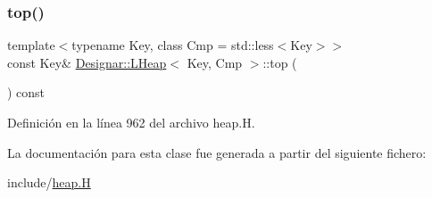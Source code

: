 \subsubsection{\texorpdfstring{top()}{top()}}
{\footnotesize\ttfamily template$<$typename Key, class Cmp = std\+::less$<$\+Key$>$$>$ \\
const Key\& \hyperlink{class_designar_1_1_l_heap}{Designar\+::\+L\+Heap}$<$ Key, Cmp $>$\+::top (\begin{DoxyParamCaption}{ }\end{DoxyParamCaption}) const\hspace{0.3cm}{\ttfamily [inline]}}



Definición en la línea 962 del archivo heap.\+H.



La documentación para esta clase fue generada a partir del siguiente fichero\+:\begin{DoxyCompactItemize}
\item 
include/\hyperlink{heap_8_h}{heap.\+H}\end{DoxyCompactItemize}
